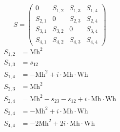 \documentclass[a4paper]{article}
\begin{document}
\begin{equation}
S=\left(\begin{array}{cccc}
   0&
   S_{1,2}&
   S_{1,3}&
   S_{1,4}\\
   S_{2,1}&
   0&
   S_{2,3}&
   S_{2,4}\\
   S_{3,1}&
   S_{3,2}&
   0&
   S_{3,4}\\
   S_{4,1}&
   S_{4,2}&
   S_{4,3}&
   S_{4,4}\end{array}\right)
\end{equation}
\begin{subequations}
\begin{align}
   S_{1,2}&=\text{Mh}^2\\
   S_{1,3}&=s_{12}\\
   S_{1,4}&=-\text{Mh}^2+i\cdot{}\text{Mh}\cdot{}\text{Wh}\\
   S_{2,3}&=\text{Mh}^2\\
   S_{2,4}&=\text{Mh}^2-s_{23}-s_{12}+i\cdot{}\text{Mh}\cdot{}\text{Wh}\\
   S_{3,4}&=-\text{Mh}^2+i\cdot{}\text{Mh}\cdot{}\text{Wh}\\
   S_{4,4}&=-2\text{Mh}^2+2i\cdot{}\text{Mh}\cdot{}\text{Wh}
\end{align}
\end{subequations}
\end{document}
